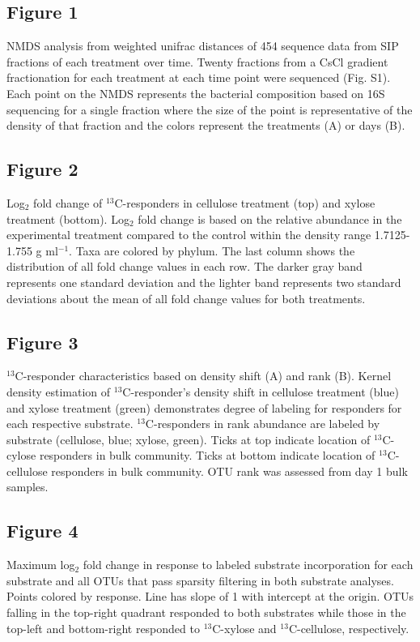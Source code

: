 \subsection{Figure 1}
NMDS analysis from weighted unifrac distances of 454 sequence data from SIP fractions of each treatment over time. Twenty fractions from a CsCl gradient fractionation for each treatment at each time point were sequenced (Fig. S1). Each point on the NMDS represents the bacterial composition based on 16S sequencing for a single fraction where the size of the point is representative of the density of that fraction and the colors represent the treatments (A) or days (B). 
\subsection{Figure 2}
Log$_{2}$ fold change of $^{13}$C-responders in cellulose
treatment (top) and xylose treatment (bottom).  Log$_{2}$ fold change is based
on the relative abundance in the experimental treatment compared to the control
within the density range 1.7125-1.755 g ml$^{-1}$. Taxa are
colored by phylum. The last column shows the distribution of all fold change values in each row. The darker gray band represents one standard deviation and the lighter band represents two standard deviations about the mean of all fold change values for both treatments.  

    
    \subsection{Figure 3}
$^{13}$C-responder characteristics based on density shift (A) and rank (B).
Kernel density estimation of $^{13}$C-responder's density shift in cellulose
treatment (blue) and xylose treatment (green) demonstrates degree of labeling
for responders for each respective substrate. $^{13}$C-responders in rank
abundance are labeled by substrate (cellulose, blue; xylose, green). Ticks at top indicate
location of $^{13}$C-cylose responders in bulk community. Ticks at bottom indicate location of
$^{13}$C-cellulose responders in bulk community. OTU rank was assessed from day 1 bulk samples.\subsection{Figure 4}
Maximum log$_{2}$ fold change in response to labeled substrate incorporation for each substrate and all OTUs that pass sparsity filtering in both substrate analyses. Points colored by response. Line has slope of 1 with intercept at the origin. OTUs falling in the top-right quadrant responded to both substrates while those in the top-left and bottom-right responded to $^{13}$C-xylose and $^{13}$C-cellulose, respectively.